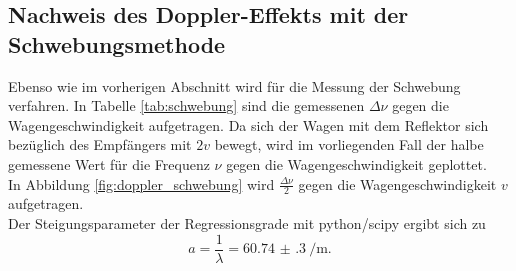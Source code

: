 \subsection{Nachweis des Doppler-Effekts mit der Schwebungsmethode}
Ebenso wie im vorherigen Abschnitt wird für die Messung der Schwebung verfahren. In Tabelle \ref{tab:schwebung} sind die gemessenen $\Delta \nu$ gegen die Wagengeschwindigkeit aufgetragen.
Da sich der Wagen mit dem Reflektor sich bezüglich des Empfängers mit $2v$ bewegt, wird im vorliegenden Fall der halbe gemessene Wert für die Frequenz $\nu$ gegen die Wagengeschwindigkeit geplottet.
\\In Abbildung \ref{fig:doppler_schwebung} wird $\frac{\Delta \nu}{2}$ gegen die Wagengeschwindigkeit $v$ aufgetragen.\\
Der Steigungsparameter der Regressionsgrade mit python/scipy \cite{scipy} ergibt sich zu
\begin{equation*}
	a=\frac{1}{\lambda}=\SI{60.74(30)}{\per\meter} \text{.}
\end{equation*}
